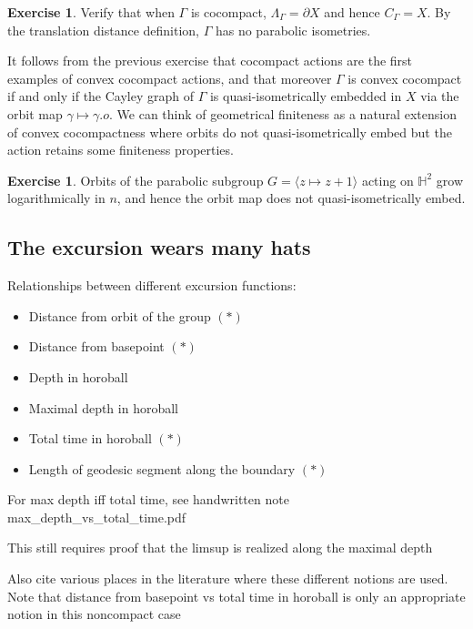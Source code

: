 \documentclass[11pt]{amsart}
\theoremstyle{plain}
\theoremstyle{definition}
\newtheorem{exercise}[proposition]{Exercise}
\theoremstyle{remark}
\begin{document}
\begin{exercise}
Verify that 
when $\Gamma$ is cocompact, $\Lambda_\Gamma=\partial X$ and hence
$C_\Gamma=X$. By the translation distance definition, $\Gamma$ has no
parabolic isometries.  
\end{exercise}

It follows from the previous exercise 
that cocompact actions are the first examples of convex
cocompact actions, and that moreover 
$\Gamma$ is convex cocompact if and only if the Cayley graph of $\Gamma$
is quasi-isometrically embedded in $X$ via the orbit map
$\gamma\mapsto\gamma.o$. 
We can think of geometrical
finiteness as a natural extension of convex cocompactness 
where orbits do not quasi-isometrically
embed  but the action retains some
finiteness properties. 

\begin{exercise}
  Orbits of the parabolic subgroup $G=\langle z\mapsto z+1\rangle$  acting on
  $\mathbb H^2$ grow logarithmically in $n$, and hence the orbit map does
  not quasi-isometrically embed. 
\end{exercise}



\subsection{The excursion wears many hats}

Relationships between different excursion functions: 

\begin{itemize}
  \item Distance from orbit of the group $(\ast)$
  \item Distance from basepoint $(\ast)$
  \item Depth in horoball
  \item Maximal depth in horoball
  \item Total time in horoball $(\ast)$
  \item Length of geodesic segment along the boundary $(\ast)$
\end{itemize}


For max depth iff total time, see handwritten note
max\_depth\_vs\_total\_time.pdf

This still requires proof that the limsup is realized along the maximal
depth

Also cite various places in the literature where these different notions are
used. Note that distance from basepoint vs total time in horoball is only
an appropriate notion in this noncompact case
\end{document}
